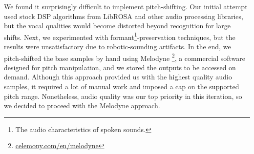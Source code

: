 We found it surprisingly difficult to implement pitch-shifting. Our initial attempt used stock DSP algorithms from LibROSA and other audio processing libraries, but the vocal qualities would become distorted beyond recognition for large shifts. Next, we experimented with formant\footnote{The audio characteristics of spoken sounds.}-preservation techniques, but the results were unsatisfactory due to robotic-sounding artifacts. In the end, we pitch-shifted the base samples by hand using Melodyne \footnote{\href{https://www.celemony.com/en/melodyne}{celemony.com/en/melodyne}}, a commercial software designed for pitch manipulation, and we stored the outputs to be accessed on demand. Although this approach provided us with the highest quality audio samples, it required a lot of manual work and imposed a cap on the supported pitch range. Nonetheless, audio quality was our top priority in this iteration, so we decided to proceed with the Melodyne approach.
